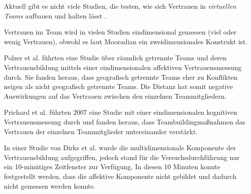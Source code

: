 \documentclass[a4paper,11pt]{article}%
\renewcommand{\\}{\vspace*{0.5\baselineskip} \newline}
\begin{document}
Aktuell gibt es nicht viele Studien, die testen, wie sich Vertrauen in \textit{virtuellen Teams} aufbauen und halten lässt \citep[S. 8-23]{duarte2006mastering}.

Vertrauen im Team wird in vielen Studien eindimensional gemessen (viel oder wenig Vertrauen), obwohl es laut Mooradian \citep[S. 524-525]{mooradian2006trusts} ein zweidimensionales Konstrukt ist.

Polzer et al. \citep[S. 682]{polzer2006extending} führten eine Studie über räumlich getrennte Teams und deren Vertrauensbildung mittels einer eindimensionalen affektiven Vertrauensmessung durch. Sie fanden heraus, dass geografisch getrennte Teams eher zu Konflikten neigen als nicht geografisch getrennte Teams. Die Distanz hat somit negative Auswirkungen auf das Vertrauen zwischen den einzelnen Teammitgliedern.

Prichard et al. \citep[S. 704]{prichard2007effects} führten 2007 eine Studie mit einer eindimensionalen kognitiven Vertrauensmessung durch und fanden heraus, dass Teambuildingmaßnahmen das Vertrauen der einzelnen Teammitglieder untereinander verstärkt.

In einer Studie von Dirks et al. \citep{dirks1999effects} wurde die multidimensionale Komponente der Vertrauensbildung aufgegriffen, jedoch stand für die Versuchsdurchführung nur ein 10-minütiges Zeitfenster zur Verfügung. In diesen 10 Minuten konnte festgestellt werden, dass die affektive Komponente nicht gebildet und dadurch nicht gemessen werden konnte. 



\newpage
\end{document}
